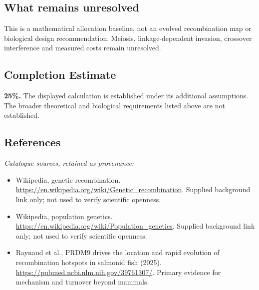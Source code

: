 \documentclass[11pt]{article}
\begin{document}
\subsection{What remains unresolved}
This is a mathematical allocation baseline, not an evolved recombination map or biological design recommendation. Meiosis, linkage-dependent invasion, crossover interference and measured costs remain unresolved.
\subsection{Completion Estimate}
\textbf{25\%.} The displayed calculation is established under its additional assumptions. The broader theoretical and biological requirements listed above are not established.
\subsection{References}
\noindent\emph{Catalogue sources, retained as provenance:}
\begin{itemize}
\item Wikipedia, genetic recombination. \url{https://en.wikipedia.org/wiki/Genetic_recombination}. Supplied background link only; not used to verify scientific openness.
\item Wikipedia, population genetics. \url{https://en.wikipedia.org/wiki/Population_genetics}. Supplied background link only; not used to verify scientific openness.
\item Raynaud et al., PRDM9 drives the location and rapid evolution of recombination hotspots in salmonid fish (2025). \url{https://pubmed.ncbi.nlm.nih.gov/39761307/}. Primary evidence for mechanism and turnover beyond mammals.
\end{itemize}
\clearpage


\appendix
\end{document}
